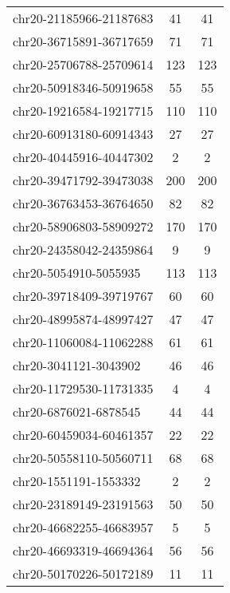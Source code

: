 \begin{longtable}{lSS}
	chr20-21185966-21187683 & 41     & 41                         \\
	chr20-36715891-36717659 & 71     & 71                         \\
	chr20-25706788-25709614 & 123    & 123                        \\
	chr20-50918346-50919658 & 55     & 55                         \\
	chr20-19216584-19217715 & 110    & 110                        \\
	chr20-60913180-60914343 & 27     & 27                         \\
	chr20-40445916-40447302 & 2      & 2                          \\
	chr20-39471792-39473038 & 200    & 200                        \\
	chr20-36763453-36764650 & 82     & 82                         \\
	chr20-58906803-58909272 & 170    & 170                        \\
	chr20-24358042-24359864 & 9      & 9                          \\
	chr20-5054910-5055935   & 113    & 113                        \\
	chr20-39718409-39719767 & 60     & 60                         \\
	chr20-48995874-48997427 & 47     & 47                         \\
	chr20-11060084-11062288 & 61     & 61                         \\
	chr20-3041121-3043902   & 46     & 46                         \\
	chr20-11729530-11731335 & 4      & 4                          \\
	chr20-6876021-6878545   & 44     & 44                         \\
	chr20-60459034-60461357 & 22     & 22                         \\
	chr20-50558110-50560711 & 68     & 68                         \\
	chr20-1551191-1553332   & 2      & 2                          \\
	chr20-23189149-23191563 & 50     & 50                         \\
	chr20-46682255-46683957 & 5      & 5                          \\
	chr20-46693319-46694364 & 56     & 56                         \\
	chr20-50170226-50172189 & 11     & 11                         \\

\end{longtable}
